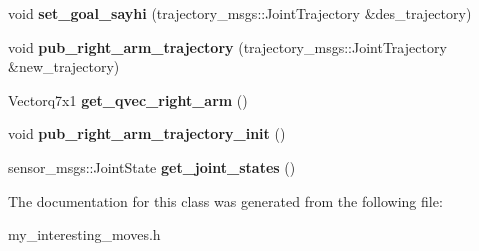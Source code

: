 \begin{DoxyCompactItemize}
\item 
\hypertarget{class_my__interesting__moves_a5a5e85c417832f083ffc87516a27b0e7}{void {\bfseries set\-\_\-goal\-\_\-sayhi} (trajectory\-\_\-msgs\-::\-Joint\-Trajectory \&des\-\_\-trajectory)}\label{class_my__interesting__moves_a5a5e85c417832f083ffc87516a27b0e7}

\item 
\hypertarget{class_my__interesting__moves_ae6aa5cdf8dcc5ecb0815c9e8b7cce1e0}{void {\bfseries pub\-\_\-right\-\_\-arm\-\_\-trajectory} (trajectory\-\_\-msgs\-::\-Joint\-Trajectory \&new\-\_\-trajectory)}\label{class_my__interesting__moves_ae6aa5cdf8dcc5ecb0815c9e8b7cce1e0}

\item 
\hypertarget{class_my__interesting__moves_aee29d1cffa39b632a7a498af43974961}{Vectorq7x1 {\bfseries get\-\_\-qvec\-\_\-right\-\_\-arm} ()}\label{class_my__interesting__moves_aee29d1cffa39b632a7a498af43974961}

\item 
\hypertarget{class_my__interesting__moves_ab372adb58a3b615a3e3fc4e6104aee7d}{void {\bfseries pub\-\_\-right\-\_\-arm\-\_\-trajectory\-\_\-init} ()}\label{class_my__interesting__moves_ab372adb58a3b615a3e3fc4e6104aee7d}

\item 
\hypertarget{class_my__interesting__moves_a9ec17aef9b2fb277ae00e63906895f03}{sensor\-\_\-msgs\-::\-Joint\-State {\bfseries get\-\_\-joint\-\_\-states} ()}\label{class_my__interesting__moves_a9ec17aef9b2fb277ae00e63906895f03}

\end{DoxyCompactItemize}


The documentation for this class was generated from the following file\-:\begin{DoxyCompactItemize}
\item 
my\-\_\-interesting\-\_\-moves.\-h\end{DoxyCompactItemize}
